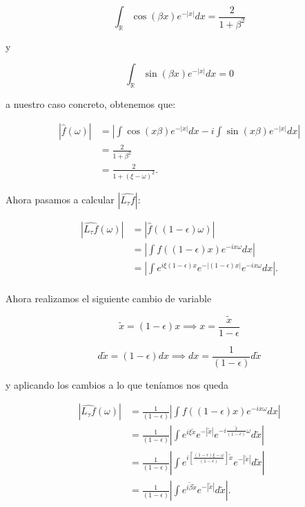 \begin{observacion}
  \begin{equation} \label{eq:res_auxiliar_1}
    \int_\mathbb{R} \cos(\beta x) e^{-|x|} dx= \frac{2}{1+\beta^2}
  \end{equation}

  \noindent y 

  \begin{equation}\label{eq:res_auxiliar_2}
    \int_\mathbb{R} \sin(\beta x) e^{-|x|} dx= 0
  \end{equation}

  \noindent a nuestro caso concreto, obtenemos que: 

  \begin{align*}
    |\widehat{f}(\omega)|&=\left|  \int{\cos(x\beta)e^{-|x|} dx} - i \int{\sin(x\beta)e^{-|x|} dx} \right| \\
    &=\frac{2}{1+\beta^2} \\
    &=\frac{2}{1+(\xi - \omega)^2}.
  \end{align*} 

  \noindent Ahora pasamos a calcular $|\widehat{L_\tau f}|$:

  \begin{align*}
    |\widehat{L_\tau f}(\omega)| &= |\widehat{f}((1-\epsilon)\omega)| \\
    &=\left|  \int{f((1-\epsilon)x)e^{-ix\omega}dx}  \right | \\
    &=\left|  \int{e^{i \xi (1-\epsilon) x}e^{-|(1-\epsilon)x|}e^{-ix\omega}dx}  \right |. \\
  \end{align*}

  \noindent Ahora realizamos el siguiente cambio de variable

  \begin{equation}
    \tilde{x}=(1-\epsilon) x \implies x=\frac{\tilde{x}}{1-\epsilon} 
  \end{equation}

  \begin{equation}
  d\tilde{x}=(1-\epsilon) dx \implies dx=\frac{1}{(1-\epsilon)}d\tilde{x}
  \end{equation}

  \noindent y aplicando los cambios a lo que teníamos nos queda

  \begin{align*}
    |\widehat{L_\tau f}(\omega)| 
    &= \frac{1}{(1-\epsilon)}\left|  \int{f((1-\epsilon)x)e^{-ix\omega}dx}  \right | \\
    &=\frac{1}{(1-\epsilon)}\left|  \int{e^{i \xi \tilde{x}}e^{-|\tilde{x}|}e^{-i\frac{\tilde{x}}{(1-\epsilon)}\omega}d\tilde{x}}  \right | \\
    &=\frac{1}{(1-\epsilon)}\left|  \int{e^{i \left[ \frac{(1-\epsilon) \xi - \omega}{(1-\epsilon)}\right]\tilde{x}}e^{-|\tilde{x}|} d\tilde{x}}  \right | \\
    &=\frac{1}{(1-\epsilon)}\left|  \int{e^{i \tilde{\beta}\tilde{x}}e^{-|\tilde{x}|} d\tilde{x}}  \right |. \\
  \end{align*}


\end{observacion}
